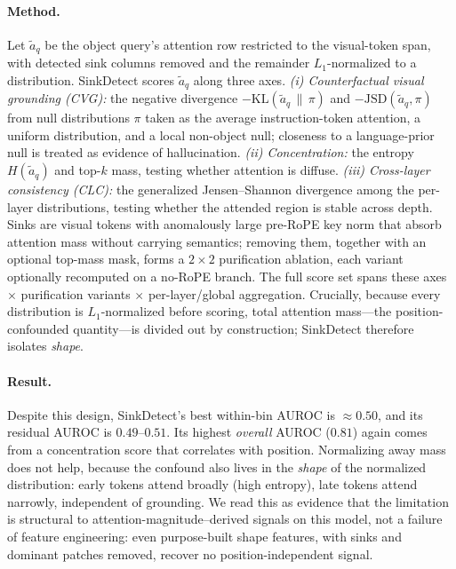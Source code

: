 \documentclass[letterpaper]{article} \usepackage[submission]{aaai2027}  \usepackage[hyphens]{url}  \usepackage{graphicx} \urlstyle{rm} \def\UrlFont{\rm}  \usepackage{natbib}  \usepackage{caption} \frenchspacing
\begin{document}
\paragraph{Method.} Let $\tilde a_q$ be the object query's attention row restricted to the visual-token span, with detected sink columns removed and the remainder $L_1$-normalized to a distribution. SinkDetect scores $\tilde a_q$ along three axes. \emph{(i) Counterfactual visual grounding (CVG):} the negative divergence $-\mathrm{KL}(\tilde a_q \,\|\, \pi)$ and $-\mathrm{JSD}(\tilde a_q, \pi)$ from null distributions $\pi$ taken as the average instruction-token attention, a uniform distribution, and a local non-object null; closeness to a language-prior null is treated as evidence of hallucination. \emph{(ii) Concentration:} the entropy $H(\tilde a_q)$ and top-$k$ mass, testing whether attention is diffuse. \emph{(iii) Cross-layer consistency (CLC):} the generalized Jensen--Shannon divergence among the per-layer distributions, testing whether the attended region is stable across depth. Sinks are visual tokens with anomalously large pre-RoPE key norm that absorb attention mass without carrying semantics; removing them, together with an optional top-mass mask, forms a $2\times2$ purification ablation, each variant optionally recomputed on a no-RoPE branch. The full score set spans these axes $\times$ purification variants $\times$ per-layer/global aggregation. Crucially, because every distribution is $L_1$-normalized before scoring, total attention mass---the position-confounded quantity---is divided out by construction; SinkDetect therefore isolates \emph{shape}.

\paragraph{Result.} Despite this design, SinkDetect's best within-bin AUROC is $\approx$$0.50$, and its residual AUROC is $0.49$--$0.51$. Its highest \emph{overall} AUROC ($0.81$) again comes from a concentration score that correlates with position. Normalizing away mass does not help, because the confound also lives in the \emph{shape} of the normalized distribution: early tokens attend broadly (high entropy), late tokens attend narrowly, independent of grounding. We read this as evidence that the limitation is structural to attention-magnitude--derived signals on this model, not a failure of feature engineering: even purpose-built shape features, with sinks and dominant patches removed, recover no position-independent signal.
\end{document}
